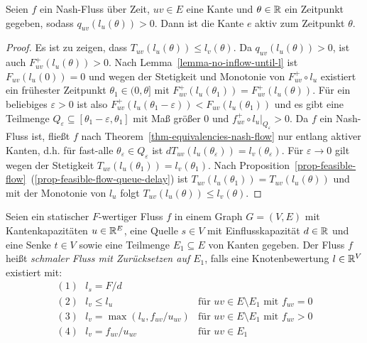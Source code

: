 \begin{lemma}\label{lemma-nash-flow-waiting-queue-implies-active-edge}
	Seien $f$ ein Nash-Fluss über Zeit, $uv\in E$ eine Kante und $\theta\in\mathbb{R}$ ein Zeitpunkt gegeben, sodass $q_{uv}(l_u(\theta)) > 0$.
	Dann ist die Kante $e$ aktiv zum Zeitpunkt $\theta$.
\end{lemma}
\begin{proof}
	Es ist zu zeigen, dass $T_{uv}(l_u(\theta)) \leq l_v(\theta)$.
	Da $q_{uv}(l_u(\theta)) > 0$, ist auch $F^+_{uv}(l_u(\theta)) > 0$.
	Nach Lemma~\ref{lemma-no-inflow-until-l} ist $F_{uv}(l_u(0))=0$ und wegen der Stetigkeit und Monotonie von $F_{uv}^+\circ l_u$ existiert
	ein frühester Zeitpunkt $\theta_1\in (0, \theta]$ mit $F_{uv}^+(l_u(\theta_1)) = F_{uv}^+(l_u(\theta))$.
	Für ein beliebiges $\varepsilon>0$ ist also $F_{uv}^+(l_u(\theta_1-\varepsilon)) < F_{uv}(l_u(\theta_1))$ und es gibt eine Teilmenge $Q_\varepsilon \subseteq [\theta_1 - \varepsilon, \theta_1]$ mit Maß größer 0 und $f_{uv}^+\circ l_u\big|_{Q_\varepsilon} > 0$.
	Da $f$ ein Nash-Fluss ist, fließt $f$ nach Theorem~\ref{thm-equivalencies-nash-flow} nur entlang aktiver Kanten, d.h. für fast-alle $\theta_\varepsilon\in Q_\varepsilon$ ist $dT_{uv}(l_u(\theta_\varepsilon))=l_v(\theta_\varepsilon)$.
	Für $\varepsilon\rightarrow0$ gilt wegen der Stetigkeit $T_{uv}(l_u(\theta_1))=l_v(\theta_1)$.
	Nach Proposition~\ref{prop-feasible-flow}~(\ref{prop-feasible-flow-queue-delay}) ist $T_{uv}(l_u(\theta_1)) = T_{uv}(l_u(\theta))$ und mit der Monotonie von $l_u$ folgt $T_{uv}(l_u(\theta))\leq l_v(\theta)$.
\end{proof}

\begin{definition}
	Seien ein statischer $F$-wertiger Fluss $f$ in einem Graph $G=(V,E)$ mit Kantenkapazitäten $u\in\mathbb{R}^E$, eine Quelle $s\in V$ mit Einflusskapazität $d\in\mathbb{R}$ und eine Senke $t\in V$ sowie eine Teilmenge $E_1\subseteq E$ von Kanten gegeben.
	Der Fluss $f$ heißt \emph{schmaler Fluss mit Zurücksetzen auf $E_1$}, falls eine Knotenbewertung $l\in\mathbb{R}^V$ existiert mit:
	$$\begin{array}{ll}
	(1)~~~	l_s = F/d& \\
	(2)~~~	l_v \leq l_u &\text{für $uv\in E \setminus E_1$ mit $f_{uv}=0$}\\
	(3)~~~	l_v = \max(l_u, f_{uv} / u_{uv} ) &\text{für $uv\in E\setminus E_1$ mit $f_{uv} > 0$}\\
	(4)~~~	l_v = f_{uv} / u_{uv} & \text{für $uv\in E_1$}
	\end{array}$$
\end{definition}

